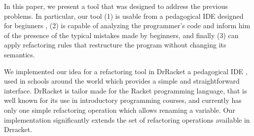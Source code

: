 In this paper, we present a tool that was designed to address the
previous problems.  In particular, our tool (1) is usable from a
pedagogical IDE designed for beginners \cite{pears2007survey}\cite{kolling2003bluej}, (2) is capable of analyzing
the programmer's code and inform him of the presence of the typical
mistakes made by beginners, and finally (3) can apply refactoring
rules that restructure the program without changing its semantics.

We implemented our idea for a refactoring tool in DrRacket a pedagogical IDE \cite{drscheme}\cite{drscheme_pegadogy},
used in schools around the world which provides a simple and straightforward interface.
DrRacket is tailor made for the Racket programming language, that is well known for its
use in introductory programming courses, and currently has only one simple refactoring
operation which allows renaming a variable.
Our implementation significantly extends the set of refactoring operations available
in Drracket.
